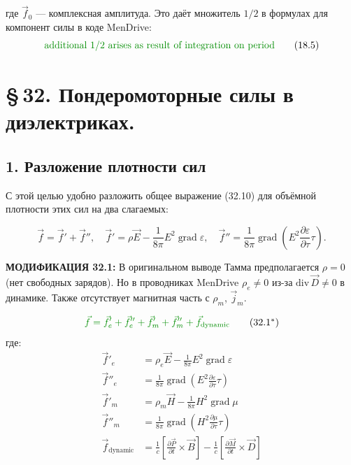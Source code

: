\documentclass[a4paper,12pt]{article}
\newcommand{\modtext}[1]{\textcolor{modcolor}{#1}}
\newcommand{\modmath}[1]{\textcolor{modcolor}{#1}}
\newcommand{\modblock}[1]{\colorbox{modcolor!10}{\parbox{\dimexpr\linewidth-2\fboxsep}{#1}}}
\begin{document}
    где $\vec{f}_0$ — комплексная амплитуда. Это даёт множитель $1/2$ в формулах
    для компонент силы в коде MenDrive:
    \begin{equation}
    \modmath{
        \text{additional 1/2 arises as result of integration on period}
    }
    \tag{18.5}
    \end{equation}



\section*{\S\,32. Пондеромоторные силы в диэлектриках.}

\subsection*{1. Разложение плотности сил}

\noindent
С этой целью удобно разложить общее выражение (32.10) для объёмной
плотности этих сил на два слагаемых:

\begin{equation}
\vec{f} = \vec{f}' + \vec{f}'',
\quad
\vec{f}' = \rho\vec{E} - \frac{1}{8\pi}E^2\operatorname{grad}\varepsilon,
\quad
\vec{f}'' = \frac{1}{8\pi}\operatorname{grad}\!\left(
E^2\frac{\partial\varepsilon}{\partial\tau}\tau
\right).
\tag{32.1}
\end{equation}

\modtext{
\textbf{МОДИФИКАЦИЯ 32.1:} В оригинальном выводе Тамма предполагается
$\rho = 0$ (нет свободных зарядов). Но в проводниках MenDrive
$\rho_e \neq 0$ из-за $\text{div}\,\vec{D} \neq 0$ в динамике. Также
отсутствует магнитная часть с $\rho_m$, $\vec{j}_m$.
}

\begin{equation}
\modmath{
\vec{f} = \vec{f}'_e + \vec{f}''_e + \vec{f}'_m + \vec{f}''_m + \vec{f}_{\text{dynamic}}
}
\tag{32.1$^*$}
\end{equation}
где:
\begin{align}
    \vec{f}'_e &= \rho_e\vec{E} - \frac{1}{8\pi}E^2\operatorname{grad}\varepsilon \\
    \vec{f}''_e &= \frac{1}{8\pi}\operatorname{grad}\!\left(
    E^2\frac{\partial\varepsilon}{\partial\tau}\tau
    \right) \\
    \vec{f}'_m &= \rho_m\vec{H} - \frac{1}{8\pi}H^2\operatorname{grad}\mu \\
    \vec{f}''_m &= \frac{1}{8\pi}\operatorname{grad}\!\left(
    H^2\frac{\partial\mu}{\partial\tau}\tau
    \right) \\
    \vec{f}_{\text{dynamic}} &= \frac{1}{c}\left[\frac{\partial\vec{P}}{\partial t}\times\vec{B}\right] -
    \frac{1}{c}\left[\frac{\partial\vec{M}}{\partial t}\times\vec{D}\right]
\end{align}
\end{document}
